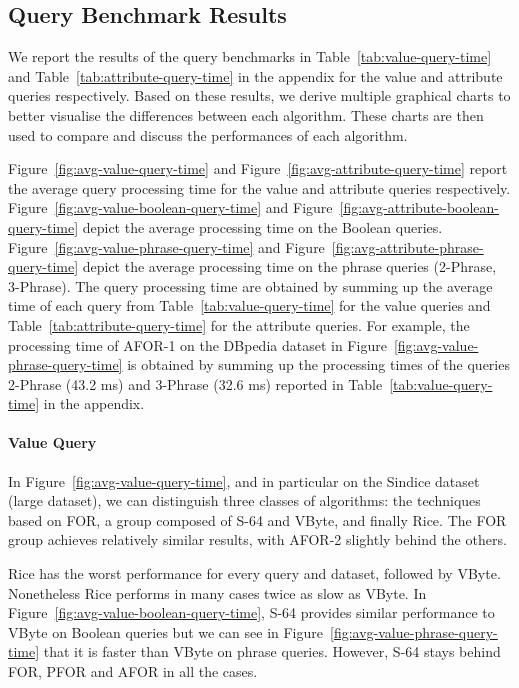 \subsection{Query Benchmark Results}

We report the results of the query benchmarks in
Table~\ref{tab:value-query-time} and Table~\ref{tab:attribute-query-time} in
the appendix for the value and attribute queries respectively. Based on these
results, we derive multiple graphical charts to better visualise the
differences between each algorithm. These charts are then used to compare and
discuss the performances of each algorithm.

Figure~\ref{fig:avg-value-query-time} and
Figure~\ref{fig:avg-attribute-query-time} report the average query processing
time for the value and attribute queries respectively.
Figure~\ref{fig:avg-value-boolean-query-time} and
Figure~\ref{fig:avg-attribute-boolean-query-time} depict the average
processing time on the Boolean queries.
Figure~\ref{fig:avg-value-phrase-query-time} and
Figure~\ref{fig:avg-attribute-phrase-query-time} depict the average processing
time on the phrase queries (2-Phrase, 3-Phrase). The query processing time are
obtained by summing up the average time of each query from
Table~\ref{tab:value-query-time} for the value queries and
Table~\ref{tab:attribute-query-time} for the attribute queries. For example,
the processing time of AFOR-1 on the DBpedia dataset in
Figure~\ref{fig:avg-value-phrase-query-time} is obtained by summing up the
processing times of the queries 2-Phrase (43.2 ms) and 3-Phrase (32.6 ms)
reported in Table~\ref{tab:value-query-time} in the appendix.

\paragraph{Value Query}

In Figure~\ref{fig:avg-value-query-time}, and in particular on the Sindice
dataset (large dataset), we can distinguish three classes of algorithms: the
techniques based on FOR, a group composed of S-64 and VByte, and finally Rice.
The FOR group achieves relatively similar results, with AFOR-2 slightly behind
the others.

Rice has the worst performance for every query and dataset, followed by VByte.
Nonetheless Rice performs in many cases twice as slow as VByte. In
Figure~\ref{fig:avg-value-boolean-query-time}, S-64 provides similar
performance to VByte on Boolean queries but we can see in
Figure~\ref{fig:avg-value-phrase-query-time} that it is faster than VByte on
phrase queries. However, S-64 stays behind FOR, PFOR and AFOR in all the cases.

